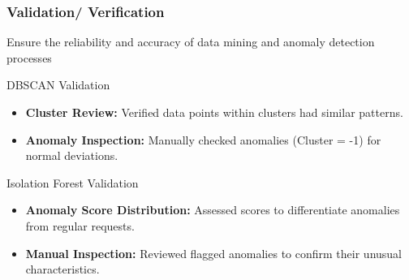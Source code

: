 \documentclass[10pt, a4paper]{beamer}
\begin{document}
	\begin{frame}
		\frametitle{Validation/ Verification}
		Ensure the reliability and accuracy of data mining and anomaly detection processes
		\begin{block}{DBSCAN Validation}
			\begin{itemize}
				\item \textbf{Cluster Review:} Verified data points within clusters had similar patterns.
				\item \textbf{Anomaly Inspection:} Manually checked anomalies (Cluster = -1) for normal deviations.
			\end{itemize}
		\end{block}
		
		\vspace{0.5cm} %
		
		\begin{block}{Isolation Forest Validation}
			\begin{itemize}
				\item \textbf{Anomaly Score Distribution:}  Assessed scores to differentiate anomalies from regular requests.
				\item \textbf{Manual Inspection:}  Reviewed flagged anomalies to confirm their unusual characteristics.
			\end{itemize}
		\end{block}
	\end{frame}
	
\end{document}
